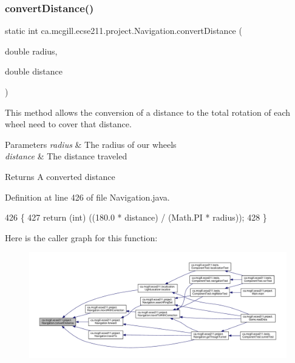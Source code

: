 \subsubsection{\texorpdfstring{convert\+Distance()}{convertDistance()}}
{\footnotesize\ttfamily static int ca.\+mcgill.\+ecse211.\+project.\+Navigation.\+convert\+Distance (\begin{DoxyParamCaption}\item[{double}]{radius,  }\item[{double}]{distance }\end{DoxyParamCaption})\hspace{0.3cm}{\ttfamily [static]}}

This method allows the conversion of a distance to the total rotation of each wheel need to cover that distance.


\begin{DoxyParams}{Parameters}
{\em radius} & The radius of our wheels \\
\hline
{\em distance} & The distance traveled \\
\hline
\end{DoxyParams}
\begin{DoxyReturn}{Returns}
A converted distance 
\end{DoxyReturn}


Definition at line 426 of file Navigation.\+java.


\begin{DoxyCode}
426                                                                     \{
427     \textcolor{keywordflow}{return} (\textcolor{keywordtype}{int}) ((180.0 * distance) / (Math.PI * radius));
428   \}
\end{DoxyCode}
Here is the caller graph for this function\+:
\nopagebreak
\begin{figure}[H]
\begin{center}
\leavevmode
\includegraphics[width=350pt]{classca_1_1mcgill_1_1ecse211_1_1project_1_1_navigation_ac9e260bcd619ffa4820d7d0de7ea1c12_icgraph}
\end{center}
\end{figure}
\mbox{\label{classca_1_1mcgill_1_1ecse211_1_1project_1_1_navigation_a7c66610c5b7496ddb35d342ab2cd3f08}} 
